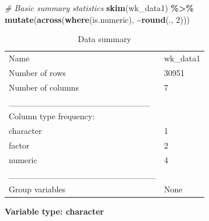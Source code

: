\documentclass[
]{article}
\newenvironment{Shaded}{\begin{snugshade}}{\end{snugshade}}
\newcommand{\CommentTok}[1]{\textcolor[rgb]{0.56,0.35,0.01}{\textit{#1}}}
\newcommand{\DecValTok}[1]{\textcolor[rgb]{0.00,0.00,0.81}{#1}}
\newcommand{\FunctionTok}[1]{\textcolor[rgb]{0.13,0.29,0.53}{\textbf{#1}}}
\newcommand{\NormalTok}[1]{#1}
\newcommand{\SpecialCharTok}[1]{\textcolor[rgb]{0.81,0.36,0.00}{\textbf{#1}}}
\begin{document}
\begin{Shaded}
\begin{Highlighting}[]
\CommentTok{\# Basic summary statistics}
\FunctionTok{skim}\NormalTok{(wk\_data1) }\SpecialCharTok{\%\textgreater{}\%}
  \FunctionTok{mutate}\NormalTok{(}\FunctionTok{across}\NormalTok{(}\FunctionTok{where}\NormalTok{(is.numeric), }\SpecialCharTok{\textasciitilde{}}\FunctionTok{round}\NormalTok{(., }\DecValTok{2}\NormalTok{)))}
\end{Highlighting}
\end{Shaded}

\begin{longtable}[]{@{}ll@{}}
\caption{Data summary}\tabularnewline
\toprule\noalign{}
\endfirsthead
\endhead
\bottomrule\noalign{}
\endlastfoot
Name & wk\_data1 \\
Number of rows & 30951 \\
Number of columns & 7 \\
\_\_\_\_\_\_\_\_\_\_\_\_\_\_\_\_\_\_\_\_\_\_\_ & \\
Column type frequency: & \\
character & 1 \\
factor & 2 \\
numeric & 4 \\
\_\_\_\_\_\_\_\_\_\_\_\_\_\_\_\_\_\_\_\_\_\_\_\_ & \\
Group variables & None \\
\end{longtable}

\textbf{Variable type: character}
\end{document}
